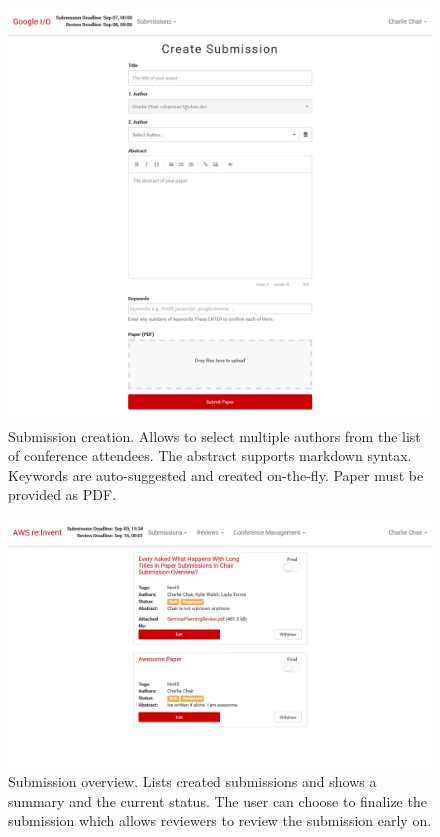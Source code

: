\documentclass[nochapterpage,nopartpage,noheadingspace,numbersubsubsec,bigchapter,colorback,accentcolor=tud9c,10pt]{tudreport}
\begin{document}
        \begin{figure}[!ht]
            \centering
            \includegraphics[width=\textwidth]{img/ui-submission-create}
            \caption{Submission creation. Allows to select multiple authors from the list of conference attendees. The abstract supports markdown syntax. Keywords are auto-suggested and created on-the-fly. Paper must be provided as PDF.}
            \label{fig:appendix:screenshots:ui-submission-create}
        \end{figure}

        \begin{figure}[!ht]
            \centering
            \includegraphics[width=\textwidth]{img/ui-submission-overview}
            \caption{Submission overview. Lists created submissions and shows a summary and the current status. The user can choose to finalize the submission which allows reviewers to review the submission early on.}
            \label{fig:appendix:screenshots:ui-submission-overview}
        \end{figure}
\end{document}
